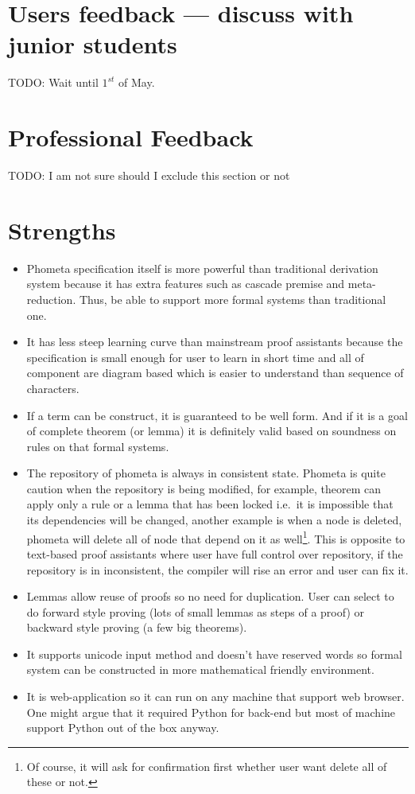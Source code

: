 \documentclass[master.tex]{subfiles}
\begin{document}
\section{Users feedback --- discuss with junior students}
TODO: Wait until $1^{st}$ of May.

\section{Professional Feedback}
TODO: I am not sure should I exclude this section or not

\section{Strengths}

\begin{itemize}
\item Phometa specification itself is more powerful than traditional derivation
  system because it has extra features such as cascade premise and
  meta-reduction. Thus, be able to support more formal systems than traditional
  one.
\item It has less steep learning curve than mainstream proof assistants because
  the specification is small enough for user to learn in short time and all of
  component are diagram based which is easier to understand than sequence of
  characters.
\item If a term can be construct, it is guaranteed to be well form. And if it is
  a goal of complete theorem (or lemma) it is definitely valid based on
  soundness on rules on that formal systems.
\item The repository of phometa is always in consistent state. Phometa is quite
  caution when the repository is being modified, for example, theorem can apply
  only a rule or a lemma that has been locked i.e.\ it is impossible that its
  dependencies will be changed, another example is when a node is deleted,
  phometa will delete all of node that depend on it as well\footnote{Of course,
    it will ask for confirmation first whether user want delete all of these or
    not.}. This is opposite to text-based proof assistants where user have full
  control over repository, if the repository is in inconsistent, the compiler
  will rise an error and user can fix it.
\item Lemmas allow reuse of proofs so no need for duplication. User can select
  to do forward style proving (lots of small lemmas as steps of a proof) or
  backward style proving (a few big theorems).
\item It supports unicode input method and doesn't have reserved words so formal
  system can be constructed in more mathematical friendly environment.
\item It is web-application so it can run on any machine that support web
  browser. One might argue that it required Python for back-end but most of
  machine support Python out of the box anyway.
\end{itemize}
\end{document}
